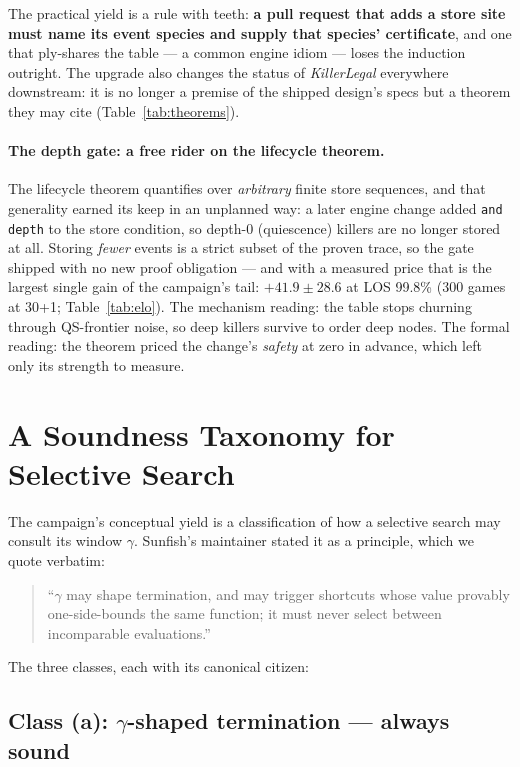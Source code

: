 \documentclass[11pt]{article}
\theoremstyle{plain}
\theoremstyle{definition}
\theoremstyle{remark}
\begin{document}
The practical yield is a rule with teeth: \textbf{a pull request that
adds a store site must name its event species and supply that species'
certificate}, and one that ply-shares the table --- a common engine
idiom --- loses the induction outright.  The upgrade also changes the
status of \emph{KillerLegal} everywhere downstream: it is no longer a
premise of the shipped design's specs but a theorem they may cite
(Table~\ref{tab:theorems}).

\paragraph{The depth gate: a free rider on the lifecycle theorem.}
The lifecycle theorem quantifies over \emph{arbitrary} finite store
sequences, and that generality earned its keep in an unplanned way: a
later engine change added \texttt{and depth} to the store condition,
so depth-0 (quiescence) killers are no longer stored at all.  Storing
\emph{fewer} events is a strict subset of the proven trace, so the
gate shipped with no new proof obligation --- and with a measured
price that is the largest single gain of the campaign's tail:
$+41.9 \pm 28.6$ at LOS 99.8\% (300 games at 30+1;
Table~\ref{tab:elo}).  The mechanism reading: the table stops churning
through QS-frontier noise, so deep killers survive to order deep
nodes.  The formal reading: the theorem priced the change's
\emph{safety} at zero in advance, which left only its strength to
measure.

\section{A Soundness Taxonomy for Selective Search}
\label{sec:taxonomy}

The campaign's conceptual yield is a classification of how a selective
search may consult its window $\gamma$.  Sunfish's maintainer stated it
as a principle, which we quote verbatim:

\begin{quote}
``$\gamma$ may shape termination, and may trigger shortcuts whose value
provably one-side-bounds the same function; it must never select between
incomparable evaluations.''
\end{quote}

The three classes, each with its canonical citizen:

\subsection{Class (a): \texorpdfstring{$\gamma$}{gamma}-shaped
termination --- always sound}
\end{document}
